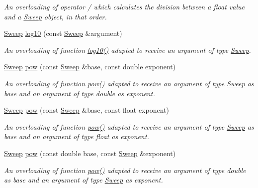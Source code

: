 \begin{DoxyCompactItemize}
\begin{DoxyCompactList}\small\item\em An overloading of operator / which calculates the division between a {\itshape float} value and a {\itshape \hyperlink{structSweep}{Sweep}} object, in that order. \end{DoxyCompactList}\item 
\hyperlink{structSweep}{Sweep} \hyperlink{structSweep_a37df38f37b1cf6a6bfb18f44b706d308}{log10} (const \hyperlink{structSweep}{Sweep} \&argument)
\begin{DoxyCompactList}\small\item\em An overloading of function {\ttfamily \hyperlink{structSweep_a37df38f37b1cf6a6bfb18f44b706d308}{log10()}} adapted to receive an argument of type {\itshape \hyperlink{structSweep}{Sweep}}. \end{DoxyCompactList}\item 
\hyperlink{structSweep}{Sweep} \hyperlink{structSweep_a11904d1c7aab3d73b5a8191019cf5328}{pow} (const \hyperlink{structSweep}{Sweep} \&base, const double exponent)
\begin{DoxyCompactList}\small\item\em An overloading of function {\ttfamily \hyperlink{structSweep_a11904d1c7aab3d73b5a8191019cf5328}{pow()}} adapted to receive an argument of type {\itshape \hyperlink{structSweep}{Sweep}} as base and an argument of type {\itshape double} as exponent. \end{DoxyCompactList}\item 
\mbox{\label{structSweep_a09ee88cfc9b28e6ec344eea1a2817ea9}} 
\hyperlink{structSweep}{Sweep} \hyperlink{structSweep_a09ee88cfc9b28e6ec344eea1a2817ea9}{pow} (const \hyperlink{structSweep}{Sweep} \&base, const float exponent)
\begin{DoxyCompactList}\small\item\em An overloading of function {\ttfamily \hyperlink{structSweep_a11904d1c7aab3d73b5a8191019cf5328}{pow()}} adapted to receive an argument of type {\itshape \hyperlink{structSweep}{Sweep}} as base and an argument of type {\itshape float} as exponent. \end{DoxyCompactList}\item 
\hyperlink{structSweep}{Sweep} \hyperlink{structSweep_a5b67922449afa96e67d4d0f61031e758}{pow} (const double base, const \hyperlink{structSweep}{Sweep} \&exponent)
\begin{DoxyCompactList}\small\item\em An overloading of function {\ttfamily \hyperlink{structSweep_a11904d1c7aab3d73b5a8191019cf5328}{pow()}} adapted to receive an argument of type {\itshape double} as base and an argument of type {\itshape \hyperlink{structSweep}{Sweep}} as exponent. \end{DoxyCompactList}\item 

\end{DoxyCompactItemize}
